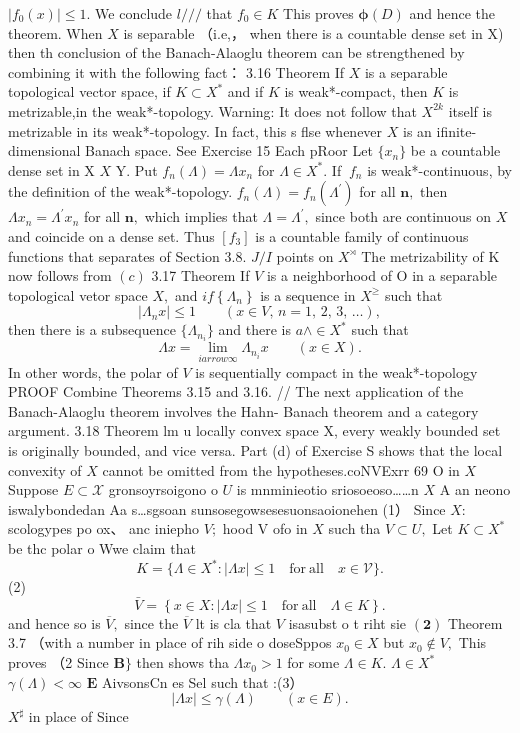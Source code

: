 $|f_{0}(x)|\leq1.$ We conclude $l/{\big/}/$ that $f_{0}\in K$ This proves $\mathbf{\phi}(D)$ and hence the theorem. When $\textstyle X$ is separable （i.e,， when there is a countable dense set in X) then th conclusion of the Banach-Alaoglu theorem can be strengthened by combining it with the following fact： 3.16 Theorem If $\textstyle X$ is a separable topological vector space, if $K\subset X^{*}$ and if $K$ is weak*-compact, then $\textstyle K$ is metrizable,in the weak*-topology. Warning: It does not follow that $X^{2k}$ itself is metrizable in its weak*-topology. In fact, this s flse whenever $X$ is an ifinite-dimensional Banach space. See Exercise 15 Each pRoor Let $\scriptstyle\{x_{n}\}$ be a countable dense set in X $\textstyle X$ Y. Put $f_{n}(\Lambda)=\Lambda x_{n}$ for $\Lambda\in X^{*}.$ If $\ f_{n}$ is weak*-continuous, by the definition of the weak*-topology. $f_{n}(\Lambda)=f_{n}(\Lambda^{\prime})$ for all ${\boldsymbol{n}},$ then $\Lambda x_{n}=\Lambda^{\prime}x_{n}$ for all ${\boldsymbol{n}},$ which implies that $\Lambda=\Lambda^{\prime},$ since both are continuous on $\textstyle X$ and coincide on a dense set. Thus $\scriptstyle[f_{3}]$ is a countable family of continuous functions that separates of Section 3.8. $J/I$ points on $X^{\rtimes}$ The metrizability of K now follows from $\left(c\right)$ 3.17 Theorem If ${\mathbf{}}V$ is a neighborhood of O in a separable topological vetor space $X,$ and $i f\left\{\Lambda_{n}\right\}$ is a sequence in $X^{\geq}$ such that $$ \vert\Lambda_{n}x\vert\le1\qquad(x\in V,\,n=1,\,2,\,3,\,\ldots), $$ then there is a subsequence $\{\Lambda_{n_{i}}\}$ and there is $a\land\in X^{*}$ such that $$ \Lambda x=\operatorname*{lim}_{i arrow\infty}\Lambda_{n_{i}}x\qquad(x\in X). $$ In other words, the polar of ${\mathbf{}}V$ is sequentially compact in the weak*-topology PROOF Combine Theorems 3.15 and 3.16. // The next application of the Banach-Alaoglu theorem involves the Hahn- Banach theorem and a category argument. 3.18 Theorem lm u locally convex space X, every weakly bounded set is originally bounded, and vice versa. Part (d) of Exercise S shows that the local convexity of $\textstyle X$ cannot be omitted from the hypotheses.coNVExrr 69 O in $\textstyle X$ Suppose $E\subset{\mathcal{X}}$ gronsoyrsoigono o $U$ is mnminieotio sriosoeoso……n $\textstyle X$ A an neono iswalybondedan Aa s…sgsoan sunsosegowsesesuonsaoionehen (1） Since $X:$ scologypes po ox、 anc iniepho $V;$ hood V ofo in $\textstyle X$ such tha $V\subset U,$ Let $K\subset X^{*}$ be thc polar o Wwe claim that $$ K=\{\Lambda\in X^{*}:|\Lambda x|\leq1\quad{\mathrm{for~all}}\quad x\in{\mathcal{V}}\}. $$ (2) $$ {\bar{V}}=\left\{x\in X\colon\left|\Lambda x\right|\leq1\quad{\mathrm{for~all}}\quad\Lambda\in K\right\}. $$ and hence so is ${\overline{{V}}},$ since the $\overline{{V}}$ lt is cla that ${\mathbf{}}V$ isasubst o t riht sie $\mathbf{(2)}$ Theorem 3.7 （with a number in place of rih side o doseSppos $x_{0}\in X$ but $x_{0}\notin V,$ This proves （2 Since ${\boldsymbol{B}}\}$ then shows tha $\Lambda x_{0}>1$ for some $\Lambda\in K.$ $\Lambda\in X^{*}$ $\gamma(\Lambda)<\infty$ ${\boldsymbol{E}}$ AivsonsCn es Sel such that :(3） $$ |\Lambda x|\leq\gamma(\Lambda)\qquad(x\in E). $$ $X^{\sharp}$ in place of Since 